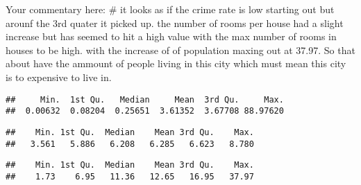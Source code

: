 \documentclass[
]{article}
\newenvironment{Shaded}{\begin{snugshade}}{\end{snugshade}}
\newcommand{\CommentTok}[1]{\textcolor[rgb]{0.56,0.35,0.01}{\textit{#1}}}
\newcommand{\FunctionTok}[1]{\textcolor[rgb]{0.00,0.00,0.00}{#1}}
\newcommand{\NormalTok}[1]{#1}
\newcommand{\SpecialCharTok}[1]{\textcolor[rgb]{0.00,0.00,0.00}{#1}}
\begin{document}
Your commentary here: \# it looks as if the crime rate is low starting
out but arounf the 3rd quater it picked up. the number of rooms per
house had a slight increase but has seemed to hit a high value with the
max number of rooms in houses to be high. with the increase of of
population maxing out at 37.97. So that about have the ammount of people
living in this city which must mean this city is to expensive to live
in.

\begin{Shaded}
\end{Shaded}

\begin{verbatim}
##     Min.  1st Qu.   Median     Mean  3rd Qu.     Max. 
##  0.00632  0.08204  0.25651  3.61352  3.67708 88.97620
\end{verbatim}

\begin{Shaded}
\end{Shaded}

\begin{verbatim}
##    Min. 1st Qu.  Median    Mean 3rd Qu.    Max. 
##   3.561   5.886   6.208   6.285   6.623   8.780
\end{verbatim}

\begin{Shaded}
\end{Shaded}

\begin{verbatim}
##    Min. 1st Qu.  Median    Mean 3rd Qu.    Max. 
##    1.73    6.95   11.36   12.65   16.95   37.97
\end{verbatim}

\begin{Shaded}
\end{Shaded}
\end{document}
